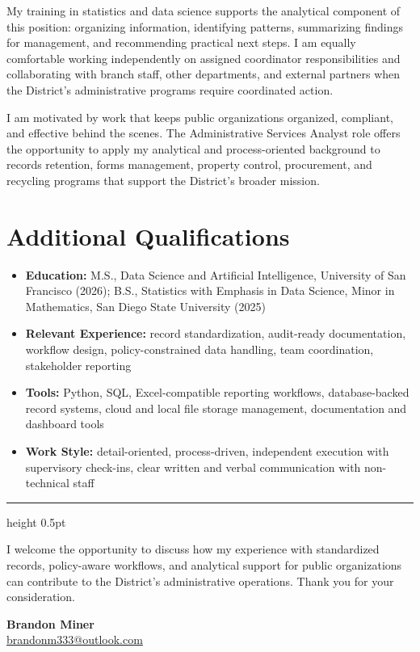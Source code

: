 \documentclass[letterpaper,11pt]{article}
\begin{document}
My training in statistics and data science supports the analytical component of this position: organizing information,
identifying patterns, summarizing findings for management, and recommending practical next steps. I am equally
comfortable working independently on assigned coordinator responsibilities and collaborating with branch staff,
other departments, and external partners when the District's administrative programs require coordinated action.

I am motivated by work that keeps public organizations organized, compliant, and effective behind the scenes.
The Administrative Services Analyst role offers the opportunity to apply my analytical and process-oriented background
to records retention, forms management, property control, procurement, and recycling programs that support the
District's broader mission.

\section{Additional Qualifications}

\begin{itemize}[leftmargin=1.5em, itemsep=3pt, topsep=4pt]
  \item \textbf{Education:} M.S., Data Science and Artificial Intelligence, University of San Francisco (2026);
        B.S., Statistics with Emphasis in Data Science, Minor in Mathematics, San Diego State University (2025)
  \item \textbf{Relevant Experience:} record standardization, audit-ready documentation, workflow design,
        policy-constrained data handling, team coordination, stakeholder reporting
  \item \textbf{Tools:} Python, SQL, Excel-compatible reporting workflows, database-backed record systems,
        cloud and local file storage management, documentation and dashboard tools
  \item \textbf{Work Style:} detail-oriented, process-driven, independent execution with supervisory check-ins,
        clear written and verbal communication with non-technical staff
\end{itemize}

\vspace{16pt}
{\color{ruleclr}\hrule height 0.5pt}
\vspace{10pt}

\noindent I welcome the opportunity to discuss how my experience with standardized records, policy-aware workflows,
and analytical support for public organizations can contribute to the District's administrative operations.
Thank you for your consideration.

\vspace{24pt}
\noindent\textbf{Brandon Miner}\\
\href{mailto:brandonm333@outlook.com}{brandonm333@outlook.com}
\end{document}

